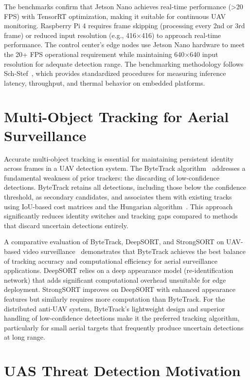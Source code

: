 \documentclass[12pt,a4paper]{report}
\begin{document}
The benchmarks confirm that Jetson Nano achieves real-time performance
(>20 FPS) with TensorRT optimization, making it suitable for continuous UAV
monitoring. Raspberry Pi 4 requires frame skipping (processing every 2nd or 3rd
frame) or reduced input resolution (e.g., 416$\times$416) to approach real-time
performance. The control center's edge nodes use Jetson Nano hardware to meet
the 20+ FPS operational requirement while maintaining 640$\times$640 input
resolution for adequate detection range. The benchmarking methodology follows
Sch-Stef~\cite{schstef2024bench}, which provides standardized procedures for
measuring inference latency, throughput, and thermal behavior on embedded platforms.

\section{Multi-Object Tracking for Aerial Surveillance}

Accurate multi-object tracking is essential for maintaining persistent
identity across frames in a UAV detection system. The ByteTrack
algorithm~\cite{zhang2022bytetrack} addresses a fundamental weakness of
prior trackers: the discarding of low-confidence detections. ByteTrack
retains all detections, including those below the confidence threshold, as secondary candidates, and associates them with existing tracks using
IoU-based cost matrices and the Hungarian algorithm~\cite{kuhn1955hungarian}. This approach
significantly reduces identity switches and tracking gaps compared to
methods that discard uncertain detections entirely.

A comparative evaluation of ByteTrack, DeepSORT, and StrongSORT on
UAV-based video surveillance~\cite{bytetrack_comparison} demonstrates
that ByteTrack achieves the best balance of tracking accuracy and
computational efficiency for aerial surveillance applications. DeepSORT
relies on a deep appearance model (re-identification network) that adds
significant computational overhead unsuitable for edge deployment.
StrongSORT improves on DeepSORT with enhanced appearance features but
similarly requires more computation than ByteTrack. For the distributed
anti-UAV system, ByteTrack's lightweight design and superior handling of
low-confidence detections make it the preferred tracking algorithm,
particularly for small aerial targets that frequently produce uncertain
detections at long range.

\section{UAS Threat Detection Motivation}
\end{document}
